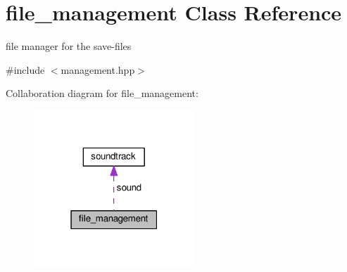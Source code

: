 \hypertarget{classfile__management}{}\section{file\+\_\+management Class Reference}
\label{classfile__management}


file manager for the save-\/files  




{\ttfamily \#include $<$management.\+hpp$>$}



Collaboration diagram for file\+\_\+management\+:
\nopagebreak
\begin{figure}[H]
\begin{center}
\leavevmode
\includegraphics[width=171pt]{classfile__management__coll__graph}
\end{center}
\end{figure}
